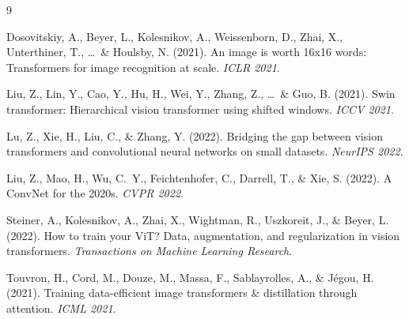 \documentclass{article}
\begin{document}
{\small

\begin{thebibliography}{9}

Dosovitskiy, A., Beyer, L., Kolesnikov, A., Weissenborn, D., Zhai, X., Unterthiner, T., \ldots\ \& Houlsby, N. (2021).
\newblock An image is worth 16x16 words: Transformers for image recognition at scale.
\newblock \textit{ICLR 2021}.

Liu, Z., Lin, Y., Cao, Y., Hu, H., Wei, Y., Zhang, Z., \ldots\ \& Guo, B. (2021).
\newblock Swin transformer: Hierarchical vision transformer using shifted windows.
\newblock \textit{ICCV 2021}.

Lu, Z., Xie, H., Liu, C., \& Zhang, Y. (2022).
\newblock Bridging the gap between vision transformers and convolutional neural networks on small datasets.
\newblock \textit{NeurIPS 2022}.

Liu, Z., Mao, H., Wu, C.~Y., Feichtenhofer, C., Darrell, T., \& Xie, S. (2022).
\newblock A ConvNet for the 2020s.
\newblock \textit{CVPR 2022}.

Steiner, A., Kolesnikov, A., Zhai, X., Wightman, R., Uszkoreit, J., \& Beyer, L. (2022).
\newblock How to train your ViT? Data, augmentation, and regularization in vision transformers.
\newblock \textit{Transactions on Machine Learning Research}.

Touvron, H., Cord, M., Douze, M., Massa, F., Sablayrolles, A., \& J\'egou, H. (2021).
\newblock Training data-efficient image transformers \& distillation through attention.
\newblock \textit{ICML 2021}.

\end{thebibliography}
}





\end{document}
